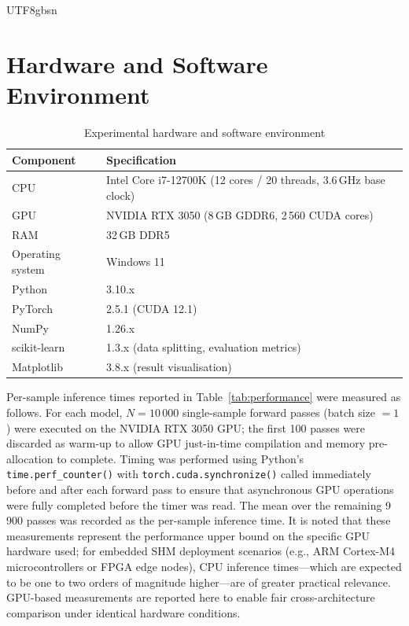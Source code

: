 \documentclass[a4paper,12pt]{report}
\begin{document}
\begin{CJK}{UTF8}{gbsn}
\section{Hardware and Software Environment}
\label{sec:environment}

\begin{table}[H]
  \centering
  \caption{Experimental hardware and software environment}
  \label{tab:environment}
  \begin{tabularx}{\textwidth}{lX}
    \toprule
    \textbf{Component} & \textbf{Specification} \\
    \midrule
    CPU & Intel Core i7-12700K (12 cores / 20 threads, 3.6\,GHz base clock) \\
    GPU & NVIDIA RTX 3050 (8\,GB GDDR6, 2\,560 CUDA cores) \\
    RAM & 32\,GB DDR5 \\
    Operating system & Windows 11 \\
    Python & 3.10.x \\
    PyTorch & 2.5.1 (CUDA 12.1) \\
    NumPy & 1.26.x \\
    scikit-learn & 1.3.x (data splitting, evaluation metrics) \\
    Matplotlib & 3.8.x (result visualisation) \\
    \bottomrule
  \end{tabularx}
\end{table}

Per-sample inference times reported in Table~\ref{tab:performance} were measured as
follows. For each model, $N = 10\,000$ single-sample forward passes (batch size $= 1$)
were executed on the NVIDIA RTX 3050 GPU; the first 100 passes were discarded as
warm-up to allow GPU just-in-time compilation and memory pre-allocation to complete.
Timing was performed using Python's \texttt{time.perf\_counter()} with
\texttt{torch.cuda.synchronize()} called immediately before and after each forward pass
to ensure that asynchronous GPU operations were fully completed before the timer was
read. The mean over the remaining 9\,900 passes was recorded as the per-sample inference
time. It is noted that these measurements represent the performance upper bound on the
specific GPU hardware used; for embedded SHM deployment scenarios (e.g., ARM Cortex-M4
microcontrollers or FPGA edge nodes), CPU inference times---which are expected to be
one to two orders of magnitude higher---are of greater practical relevance. GPU-based
measurements are reported here to enable fair cross-architecture comparison under
identical hardware conditions.


\end{CJK}
\end{document}
